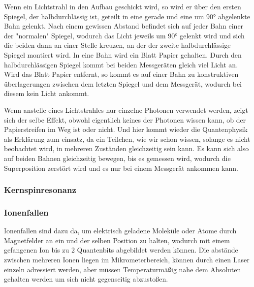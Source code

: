 Wenn ein Lichtstrahl in den Aufbau geschickt wird, so wird er über den ersten Spiegel, der halbdurchlässig ist, geteilt in eine gerade und eine um 90° abgelenkte Bahn gelenkt. Nach einem gewissen Abstand befindet sich auf jeder Bahn einer der "normalen" Spiegel, wodurch das Licht jeweils um 90° gelenkt wird und sich die beiden dann an einer Stelle kreuzen, an der der zweite halbdurchlässige Spiegel montiert wird. In eine Bahn wird ein Blatt Papier gehalten. Durch den halbdurchlässigen Spiegel kommt bei beiden Messgeräten gleich viel Licht an. Wird das Blatt Papier entfernt, so kommt es auf einer Bahn zu konstruktiven überlagerungen zwischen dem letzten Spiegel und dem Messgerät, wodurch bei diesem kein Licht ankommt.

Wenn anstelle eines Lichtstrahles nur einzelne Photonen verwendet werden, zeigt sich der selbe Effekt, obwohl eigentlich keines der Photonen wissen kann, ob der Papierstreifen im Weg ist oder nicht. Und hier kommt wieder die Quantenphysik als Erklärung zum einsatz, da ein Teilchen, wie wir schon wissen, solange es nicht beobachtet wird, in mehreren Zuständen gleichzeitig sein kann. Es kann sich also auf beiden Bahnen gleichzeitig bewegen, bis es gemessen wird, wodurch die Superposition zerstört wird und es nur bei einem Messgerät ankommen kann.

\subsubsection{Kernspinresonanz}


\subsubsection{Ionenfallen}

Ionenfallen sind dazu da, um elektrisch geladene Moleküle oder Atome durch Magnetfelder an ein und der selben Position zu halten, wodurch mit einem gefangenen Ion bis zu 2 Quantenbits abgebildet werden können. Die abstände zwischen mehreren Ionen liegen im Mikrometerbereich, können durch einen Laser einzeln adressiert werden, aber müssen Temperaturmäßig nahe dem Absoluten gehalten werden um sich nicht gegenseitig abzustoßen.

